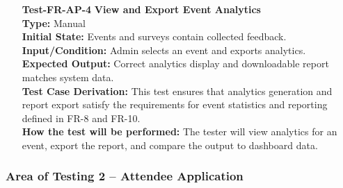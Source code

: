 \documentclass[12pt, titlepage]{article}
\begin{document}
\begin{enumerate}
\item[\textbf{Test-FR-AP-4}] \textbf{View and Export Event Analytics}\\
\textbf{Type:} Manual\\
\textbf{Initial State:} Events and surveys contain collected feedback.\\
\textbf{Input/Condition:} Admin selects an event and exports analytics.\\
\textbf{Expected Output:} Correct analytics display and downloadable report matches system data.\\
\textbf{Test Case Derivation:} This test ensures that analytics generation and report export satisfy the requirements for event statistics and reporting defined in FR-8 and FR-10.\\
\textbf{How the test will be performed:} The tester will view analytics for an event, export the report, and compare the output to dashboard data.\\[12pt]

\end{enumerate}

\subsubsection{Area of Testing 2 – Attendee Application}
\end{document}
